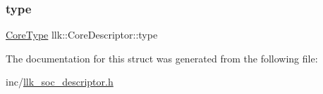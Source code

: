 \mbox{\label{structllk_1_1CoreDescriptor_a7191de431135e380831699043a13b26d}} 
\subsubsection{\texorpdfstring{type}{type}}
{\footnotesize\ttfamily \hyperlink{namespacellk_ad3e730e596589754342a98abd7021ed4}{Core\+Type} llk\+::\+Core\+Descriptor\+::type}



The documentation for this struct was generated from the following file\+:\begin{DoxyCompactItemize}
\item 
inc/\hyperlink{llk__soc__descriptor_8h}{llk\+\_\+soc\+\_\+descriptor.\+h}\end{DoxyCompactItemize}
